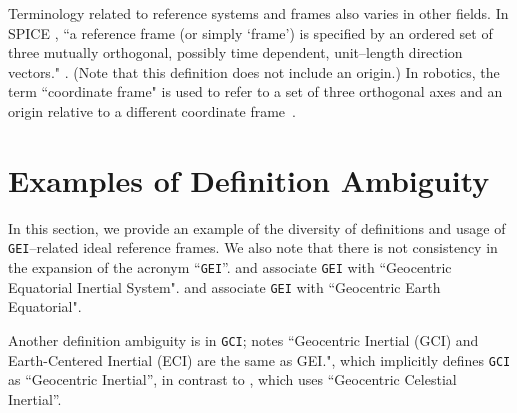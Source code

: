 \documentclass[draft]{agujournal2019}
\begin{document}

Terminology related to reference systems and frames also varies in other fields. In SPICE \cite{NAIFGeneral2025}, ``a reference frame (or simply `frame') is specified by an ordered set of three mutually orthogonal, possibly time dependent, unit--length direction vectors." \cite{NAIFOverview2023}. (Note that this definition does not include an origin.) In robotics, the term ``coordinate frame" is used to refer to a set of three orthogonal axes and an origin relative to a different coordinate frame~\cite{Murray2017}. 

\section{Examples of Definition Ambiguity}
\label{sect:definitions}

In this section, we provide an example of the diversity of definitions and usage of \texttt{GEI}--related ideal reference frames. We also note that there is not consistency in the expansion of the acronym ``\texttt{GEI}''.  and  associate \texttt{GEI} with ``Geocentric Equatorial Inertial System".  and  associate \texttt{GEI} with ``Geocentric Earth Equatorial".

Another definition ambiguity is in \texttt{GCI};  notes ``Geocentric Inertial (GCI) and Earth-Centered Inertial (ECI) are the same as GEI.", which implicitly defines \texttt{GCI} as ``Geocentric Inertial'', in contrast to  , which uses ``Geocentric Celestial Inertial''. 
\end{document}
